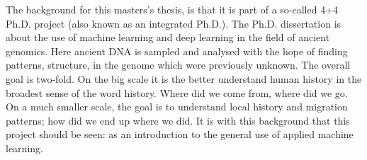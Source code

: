 
The background for this masters's thesis, is that it is part of a so-called 4+4 Ph.D. project (also known as an integrated Ph.D.). The Ph.D. dissertation is about the use of machine learning and deep learning in the field of ancient genomics. Here ancient DNA is sampled and analysed with the hope of finding patterns, structure, in the genome which were previously unknown. The overall goal is two-fold. On the big scale it is the better understand human history in the broadest sense of the word history. Where did we come from, where did we go. On a much smaller scale, the goal is to understand local history and migration patterns; how did we end up where we did. It is with this background that this project should be seen: as an introduction to the general use of applied machine learning.
